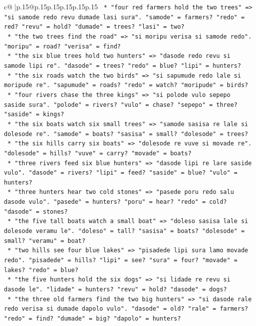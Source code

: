 \documentclass{article}
\begin{document}
{\begin{supertabular}{c@{$\;$}|p{.15\linewidth}@{}p{.15\linewidth}p{.15\linewidth}p{.15\linewidth}p{.15\linewidth}p{.15\linewidth}}
{{{\texttt{                *   "four red farmers hold the two trees" => "si samode redo revu dumade lasi sura". "samode" = farmers? "redo" = red? "revu" = hold? "dumade" = trees? "lasi" = two?} \\
\texttt{                *   "the two trees find the road" => "si moripu verisa si samode redo". "moripu" = road? "verisa" = find?} \\
\texttt{                *   "the six blue trees hold two hunters" => "dasode redo revu si samode lipi re". "dasode" = trees? "redo" = blue? "lipi" = hunters?} \\
\texttt{                *   "the six roads watch the two birds" => "si sapumude redo lale si moripude re". "sapumude" = roads? "redo" = watch? "moripude" = birds?} \\
\texttt{                *   "four rivers chase the three kings" => "si polode vulo sepepo saside sura". "polode" = rivers? "vulo" = chase? "sepepo" = three? "saside" = kings?} \\
\texttt{                *   "the six boats watch six small trees" => "samode sasisa re lale si dolesode re". "samode" = boats? "sasisa" = small? "dolesode" = trees?} \\
\texttt{                *   "the six hills carry six boats" => "dolesode re vuve si movade re". "dolesode" = hills? "vuve" = carry? "movade" = boats?} \\
\texttt{                *   "three rivers feed six blue hunters" => "dasode lipi re lare saside vulo". "dasode" = rivers? "lipi" = feed? "saside" = blue? "vulo" = hunters?} \\
\texttt{                *   "three hunters hear two cold stones" => "pasede poru redo salu dasode vulo". "pasede" = hunters? "poru" = hear? "redo" = cold? "dasode" = stones?} \\
\texttt{                *   "the five tall boats watch a small boat" => "doleso sasisa lale si dolesode veramu le". "doleso" = tall? "sasisa" = boats? "dolesode" = small? "veramu" = boat?} \\
\texttt{                *   "two hills see four blue lakes" => "pisadede lipi sura lamo movade redo". "pisadede" = hills? "lipi" = see? "sura" = four? "movade" = lakes? "redo" = blue?} \\
\texttt{                *   "the five hunters hold the six dogs" => "si lidade re revu si dasode le". "lidade" = hunters? "revu" = hold? "dasode" = dogs?} \\
\texttt{                *   "the three old farmers find the two big hunters" => "si dasode rale redo verisa si dumade dapolo vulo". "dasode" = old? "rale" = farmers? "redo" = find? "dumade" = big? "dapolo" = hunters?} \\
}}}
\end{supertabular}}
\end{document}
